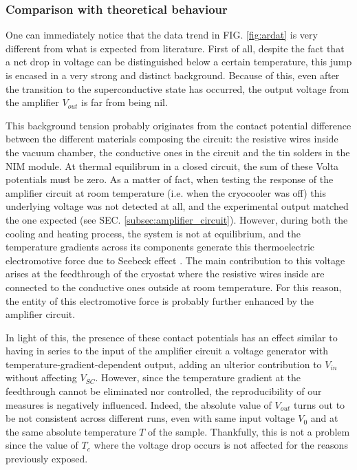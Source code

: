\documentclass[rmp,10pt,onecolumn,fleqn,notitlepage]{revtex4-1}
\begin{document}
\subsubsection{Comparison with theoretical behaviour}
\label{subsec:comparison_theoretical_behaviour}

One can immediately notice that the data trend in FIG. \ref{fig:ardat} is very different from what is expected from literature. First of all, despite the fact that a net drop in voltage can be distinguished below a certain temperature, this jump is encased in a very strong and distinct background. Because of this, even after the transition to the superconductive state has occurred, the output voltage from the amplifier $V_{out}$ is far from being nil.

This background tension probably originates from the contact potential difference between the different materials composing the circuit: the resistive wires inside the vacuum chamber, the conductive ones in the circuit and the tin solders in the NIM module. At thermal equilibrum in a closed circuit, the sum of these Volta potentials must be zero. As a matter of fact, when testing the response of the amplifier circuit at room temperature (i.e. when the cryocooler was off) this underlying voltage was not detected at all, and the experimental output matched the one expected (see SEC. \ref{subsec:amplifier_circuit}). However, during both the cooling and heating process, the system is not at equilibrium, and the temperature gradients across its components generate this thermoelectric electromotive force due to Seebeck effect \cite{mazzoldi2002fisica}. The main contribution to this voltage arises at the feedthrough of the cryostat where the resistive wires inside are connected to the conductive ones outside at room temperature. For this reason, the entity of this electromotive force is probably further enhanced by the amplifier circuit.

In light of this, the presence of these contact potentials has an effect similar to having in series to the input of the amplifier circuit a voltage generator with temperature-gradient-dependent output, adding an ulterior contribution to $V_{in}$ without affecting $V_{SC}$. However, since the temperature gradient at the feedthrough cannot be eliminated nor controlled, the reproducibility of our measures is negatively influenced. Indeed, the absolute value of $V_{out}$ turns out to be not consistent across different runs, even with same input voltage $V_0$ and at the same absolute temperature $T$ of the sample. Thankfully, this is not a problem since the value of $T_c$ where the voltage drop occurs is not affected for the reasons previously exposed.
\end{document}
